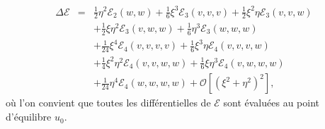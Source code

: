 \documentclass{article}
\begin{document}
\begin{eqnarray}
  \Delta \mathcal{E} & = & \tfrac{1}{2} \eta^2 \mathcal{E}_2 (w, w) +
  \tfrac{1}{6} \xi^3 \mathcal{E}_3 (v, v, v) + \tfrac{1}{2} \xi^2 \eta
  \mathcal{E}_3 (v, v, w) \nonumber\\
  &  & + \tfrac{1}{2} \xi \eta^2 \mathcal{E}_3 (v, w, w) + \tfrac{1}{6}
  \eta^3 \mathcal{E}_3 (w, w, w) \nonumber\\
  &  & + \tfrac{1}{24} \xi^4 \mathcal{E}_4 (v, v, v, v) + \tfrac{1}{6} \xi^3
  \eta \mathcal{E}_4 (v, v, v, w) \nonumber\\
  &  & + \tfrac{1}{4} \xi^2 \eta^2 \mathcal{E}_4 (v, v, w, w) + \tfrac{1}{6}
  \xi \eta^3 \mathcal{E}_4 (v, w, w, w) \nonumber\\
  &  & + \tfrac{1}{24} \eta^4 \mathcal{E}_4 (w, w, w, w) +\mathcal{O} [(\xi^2
  + \eta^2)^2],
\end{eqnarray}
o{\`u} l'on convient que toutes les diff{\'e}rentielles de $\mathcal{E}$ sont
{\'e}valu{\'e}es au point d'{\'e}quilibre $u_0$.
\end{document}
